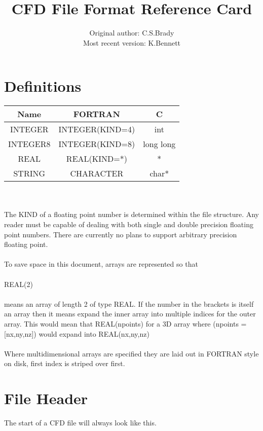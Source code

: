 \documentclass[8pt]{article} \usepackage{url,graphicx,tabularx,array}
\begin{document}
\title{CFD File Format Reference Card} \author{Original author: C.S.Brady\\Most
  recent version: K.Bennett}
\maketitle

\section{Definitions}

\begin{tabular}{c | c | c} Name & FORTRAN & C\\ \hline INTEGER &
  INTEGER(KIND=4) & int\\ INTEGER8 & INTEGER(KIND=8)& long long\\ REAL &
  REAL(KIND=*)& *\\ STRING & CHARACTER & char*\\
\end{tabular}\\\\

The KIND of a floating point number is determined within the
file structure. Any reader must be capable of dealing with both single and
double precision floating point numbers. There are currently no plans to
support arbitrary precision floating point.\\\\

To save space in this document, arrays are represented so that\\\\

REAL(2)\\\\

means an array of length 2 of type REAL. If the number in the brackets is
itself an array then it means expand the inner array into multiple indices
for the outer array. This would mean that REAL(npoints) for a 3D array where
(npoints =[nx,ny,nz]) would expand into REAL(nx,ny,nz)\\\\

Where multidimensional arrays are specified they are laid out in FORTRAN style
on disk, first index is striped over first.\\

\section{File Header}
The start of a CFD file will always look like this.\\
\end{document}
